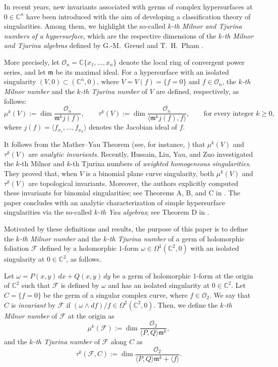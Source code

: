 \documentclass[12pt,letterpaper]{amsart}
\newcommand{\C}{\mathbb{C}}
\newcommand{\F}{\mathcal{F}}
\newcommand{\m}{\mathfrak{m}}
\begin{document}
In recent years, new invariants associated with germs of complex hypersurfaces at $0 \in \C^n$ have been introduced with the aim of developing a classification theory of singularities. Among them, we highlight the so-called \textit{$k$-th Milnor and Tjurina numbers of a hypersurface}, which are the respective dimensions of the \textit{$k$-th Milnor and Tjurina algebras} defined by G.-M.~Greuel and T.~H.~Pham \cite{Pham}. 
\par More precisely, let $\mathcal{O}_n = \C\{x_1, \ldots, x_n\}$ denote the local ring of convergent power series, and let $\m$ be its maximal ideal. For a hypersurface with an isolated singularity $(V,0) \subset (\C^n,0)$, where $V=V(f)=\{f=0\}$ and $f\in\mathcal{O}_n$, the \textit{$k$-th Milnor number} and the \textit{$k$-th Tjurina number} of $V$ are defined, respectively, as follows:
\[
\mu^{k}(V) := \dim \frac{\mathcal{O}_n}{\m^k j(f)}, \qquad 
\tau^{k}(V) := \dim \frac{\mathcal{O}_n}{\langle \m^k j(f), f \rangle}, 
\qquad \text{for every integer } k \geq 0,
\]
where $j(f) = \langle f_{x_1}, \ldots, f_{x_n} \rangle$ denotes the Jacobian ideal of $f$.  
\par It follows from the Mather–Yau Theorem (see, for instance, \cite[Theorems 2.26 and 2.28]{Greuel}) that $\mu^k(V)$ and $\tau^k(V)$ are \textit{analytic invariants}. 
Recently, Hussain, Liu, Yau, and Zuo \cite{k-Milnor} investigated the $k$-th Milnor and $k$-th Tjurina numbers of \textit{weighted homogeneous singularities}. They proved that, when $V$ is a binomial plane curve singularity, both $\mu^k(V)$ and $\tau^k(V)$ are topological invariants. Moreover, the authors explicitly computed these invariants for binomial singularities; see Theorems A, B, and C in \cite{k-Milnor}. The paper concludes with an analytic characterization of simple hypersurface singularities via the so-called \textit{$k$-th Yau algebras}; see Theorem D in \cite{k-Milnor}.

\par Motivated by these definitions and results, the purpose of this paper is to define the \textit{$k$-th Milnor number} and the \textit{$k$-th Tjurina number} of a germ of holomorphic foliation $\F$ defined by a holomorphic $1$-form $\omega \in \Omega^{1}(\C^2,0)$ with an isolated singularity at $0 \in \C^2$, as follows.  

Let $\omega = P(x,y)\,dx + Q(x,y)\,dy$ be a germ of holomorphic $1$-form at the origin of $\C^2$ such that $\F$ is defined by $\omega$ and has an isolated singularity at $0 \in \C^2$. Let $C  = \{ f = 0 \}$ be the germ of a singular complex curve, where $f \in \mathcal{O}_2$. We say that $C$ is \textit{invariant} by $\F$ if $(\omega \wedge df)/f \in \Omega^{2}(\C^2,0)$. Then, we define the \textit{$k$-th Milnor number} of $\F$ at the origin as
\[
\mu^{k}(\F) := \dim \frac{\mathcal{O}_2}{\langle P, Q \rangle \m^k},
\]
and the \textit{$k$-th Tjurina number} of $\F$ along $C$ as
\[
\tau^{k}(\F,C) := \dim \frac{\mathcal{O}_2}{\langle P, Q \rangle \m^k + \langle f \rangle}.
\]
\end{document}

